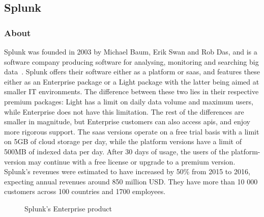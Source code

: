 \subsection{Splunk}
\subsubsection{About}
Splunk was founded in 2003 by Michael Baum, Erik Swan and Rob Das, and is a software company producing software for analysing, monitoring and searching big data~\cite{derrickharris2010}. Splunk offers their software either as a platform or \gls{saas}, and features these either as an Enterprise package or a Light package with the latter being aimed at smaller IT environments. The difference between these two lies in their respective premium packages: Light has a limit on daily data volume and maximum users, while Enterprise does not have this limitation. The rest of the differences are smaller in magnitude, but Enterprise customers can also access \glspl{api}, and enjoy more rigorous support. The \gls{saas} versions operate on a free trial basis with a limit on 5GB of cloud storage per day, while the platform versions have a limit of 500MB of indexed data per day. After 30 days of usage, the users of the platform-version may continue with a free license or upgrade to a premium version. Splunk's revenues were estimated to have increased by 50\% from 2015 to 2016, expecting annual revenues around 850 million USD. They have more than 10 000 customers across 100 countries and 1700 employees.

\begin{figure}[H]
    \centering
    \caption{Splunk's Enterprise product~\cite{splunkinc20162}}
    \label{fig:splunk}
\end{figure}

